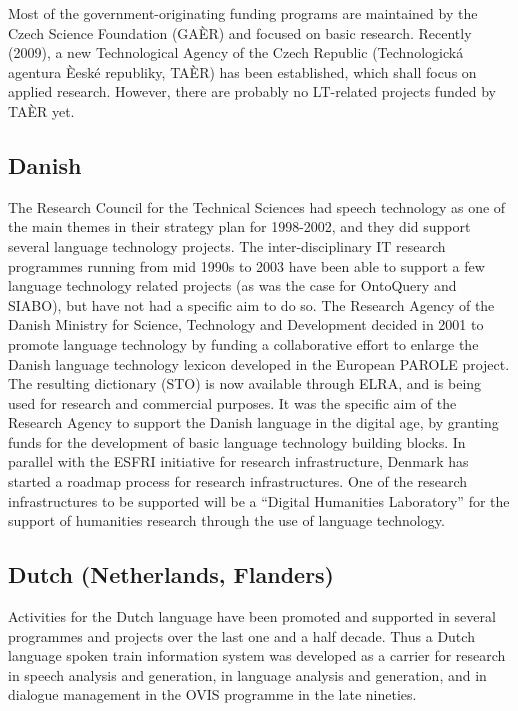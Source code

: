 \documentclass[10pt, plain]{../../metanetpaper}
\begin{document}
\begin{multicols}{2}
Most of the government-originating funding programs are maintained by the Czech Science Foundation (GAÈR) and focused on basic research. Recently (2009), a new Technological Agency of the Czech Republic (Technologická agentura Èeské republiky, TAÈR) has been established, which shall focus on applied research. However, there are probably no LT-related projects funded by TAÈR yet. 

\subsection*{Danish}
\label{sec:danish}

The Research Council for the Technical Sciences had speech technology as one of the main themes in their strategy plan for 1998-2002, and they did support several language technology projects. The inter-disciplinary IT research programmes running from mid 1990s to 2003 have been able to support a few language technology related projects (as was the case for OntoQuery and SIABO), but have not had a specific aim to do so.
The Research Agency of the Danish Ministry for Science, Technology and Development decided in 2001 to promote language technology by funding a collaborative effort to enlarge the Danish language technology lexicon developed in the European PAROLE project. The resulting dictionary (STO) is now available through ELRA, and is being used for research and commercial purposes. It was the specific aim of the Research Agency to support the Danish language in the digital age, by granting funds for the development of basic language technology building blocks.
In parallel with the ESFRI initiative for research infrastructure, Denmark has started a roadmap process for research infrastructures. One of the research infrastructures to be supported will be a “Digital Humanities Laboratory” for the support of humanities research through the use of language technology.

\subsection*{Dutch (Netherlands, Flanders)}
\label{sec:dutch-neth-fland}

Activities for the Dutch language have been promoted and supported in several programmes and projects over the last one and a half decade. Thus a Dutch language spoken train information system was developed as a carrier for research in speech analysis and generation, in language analysis and generation, and in dialogue management in the OVIS programme in the late nineties. 


\end{multicols}
\end{document}
